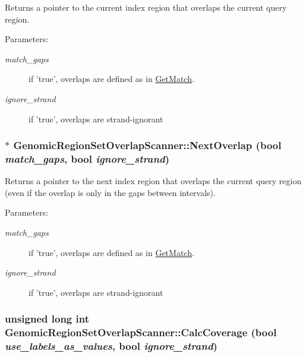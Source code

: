 Returns a pointer to the current index region that overlaps the current query region. 

\begin{Desc}
\item[Parameters:]
\begin{description}
\item[{\em match\_\-gaps}]if 'true', overlaps are defined as in \hyperlink{classGenomicRegionSetOverlapScanner_8fabf222feb13df18c4516a0c11e6c94}{GetMatch}. \item[{\em ignore\_\-strand}]if 'true', overlaps are strand-ignorant \end{description}
\end{Desc}
\hypertarget{classGenomicRegionSetOverlapScanner_3358b5f338f92581b2e47f8e8ec9b0ef}{
\subsubsection[NextOverlap]{ $\ast$ GenomicRegionSetOverlapScanner::NextOverlap (bool {\em match\_\-gaps}, \/  bool {\em ignore\_\-strand})}}
\label{classGenomicRegionSetOverlapScanner_3358b5f338f92581b2e47f8e8ec9b0ef}


Returns a pointer to the next index region that overlaps the current query region (even if the overlap is only in the gaps between intervals). 

\begin{Desc}
\item[Parameters:]
\begin{description}
\item[{\em match\_\-gaps}]if 'true', overlaps are defined as in \hyperlink{classGenomicRegionSetOverlapScanner_8fabf222feb13df18c4516a0c11e6c94}{GetMatch}. \item[{\em ignore\_\-strand}]if 'true', overlaps are strand-ignorant \end{description}
\end{Desc}
\hypertarget{classGenomicRegionSetOverlapScanner_2b51a7827283cf09ce9d0a822714d738}{
\subsubsection[CalcCoverage]{\setlength{\rightskip}{0pt plus 5cm}unsigned long int GenomicRegionSetOverlapScanner::CalcCoverage (bool {\em use\_\-labels\_\-as\_\-values}, \/  bool {\em ignore\_\-strand})}}
\label{classGenomicRegionSetOverlapScanner_2b51a7827283cf09ce9d0a822714d738}



